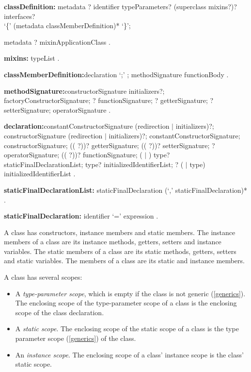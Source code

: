 \documentclass{article}
\begin{document}
\begin{grammar}
{\bf classDefinition:}
metadata \ABSTRACT{}?  \CLASS{} identifier typeParameters? (superclass mixins?)? interfaces? \\
       `\{' (metadata classMemberDefinition)* `\}';

metadata \ABSTRACT{}?  \CLASS{} mixinApplicationClass
    .

{\bf mixins:}
  \WITH{} typeList
  .

{\bf classMemberDefinition:}declaration `{\escapegrammar ;}' ;
       methodSignature functionBody
    .

{\bf methodSignature:}constructorSignature initializers?;
      factoryConstructorSignature;
      \STATIC{}? functionSignature;
      \STATIC{}? getterSignature;
      \STATIC{}? setterSignature;
      operatorSignature
    .

{\bf declaration:}constantConstructorSignature (redirection $|$ initializers)?;
      constructorSignature (redirection $|$ initializers)?;
      \EXTERNAL{} constantConstructorSignature;
      \EXTERNAL{} constructorSignature;
      ((\EXTERNAL{} \STATIC{} ?))? getterSignature;
      ((\EXTERNAL{} \STATIC{}?))? setterSignature;
      \EXTERNAL{}? operatorSignature;
       ((\EXTERNAL{} \STATIC{}?))? functionSignature;
      \STATIC{} (\FINAL{} $|$ \CONST{}) type? staticFinalDeclarationList;
      \FINAL{} type? initializedIdentifierList;
      \STATIC{}? (\VAR{} $|$ type) initializedIdentifierList
    .

{\bf staticFinalDeclarationList:}
    staticFinalDeclaration (`,' staticFinalDeclaration)*
    .

{\bf staticFinalDeclaration:}
      identifier `=' expression
    .

\end{grammar}

\LMHash{}
A class has constructors,  instance members and static members. The instance members of a class are its instance methods, getters, setters and instance variables. The static members of a class are its static methods, getters, setters and static variables. The members of a class are its static and instance members.

A class has several scopes:
\begin{itemize}
\item A {\em type-parameter scope}, which is empty if the class is not generic (\ref{generics}).  The enclosing scope of the type-parameter scope of a class is the enclosing scope of the class declaration.
\item A {\em static scope}. The enclosing scope of the static scope of a  class is the type parameter scope (\ref{generics}) of the class.
\item  An {\em instance scope}.
The enclosing scope of a class' instance scope is the class' static scope.
\end{itemize}
\end{document}

